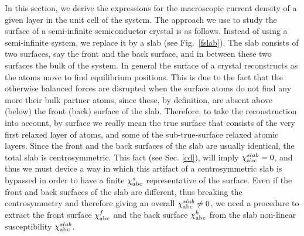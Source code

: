 \documentclass{article}
\begin{document}
In this section, we derive the expressions for the macroscopic current
density of a given layer in the unit cell of the system.
The approach we use to study the surface of a semi-infinite
semiconductor crystal is as follows. Instead of using a
semi-infinite system, we replace it by a slab (see Fig.~\ref{fslab}).
The slab consists of
two surfaces, say the front and the back surface, and in between these
two surfaces the bulk of the system. 
In
general the surface of a crystal reconstructs as the atoms
move to find equilibrium positions. This is due to the fact that
the otherwise
balanced forces are disrupted when the surface atoms do not find any
more their bulk partner atoms, since these, by definition, are absent
above (below) the front (back) surface of the slab. 
Therefore, to take the reconstruction into account, by surface we really mean
the true surface that consists of the very first relaxed layer of atoms, and
some of the sub-true-surface relaxed atomic layers.
Since the front and the back
surfaces of the slab are usually identical, the total slab is
centrosymmetric. This fact (see Sec. \ref{cd}), will imply $\chi^{slab}_{\mathrm{a}\mathrm{b}\mathrm{c}}=0$, and thus we must
device a way in which this artifact of a centrosymmetric slab is
bypassed in order to have a finite $\chi^s_{\mathrm{a}\mathrm{b}\mathrm{c}}$ representative of the
surface. Even if the front and back surfaces of the slab 
are different, thus breaking the centrosymmetry and therefore giving an
overall $\chi^{slab}_{\mathrm{a}\mathrm{b}\mathrm{c}}\ne 0$, we
need a procedure to extract the front surface $\chi^f_{\mathrm{a}\mathrm{b}\mathrm{c}}$
and
the back surface $\chi^b_{\mathrm{a}\mathrm{b}\mathrm{c}}$ from the slab non-linear
susceptibility $\chi^{slab}_{\mathrm{a}\mathrm{b}\mathrm{c}}$.
\end{document}
